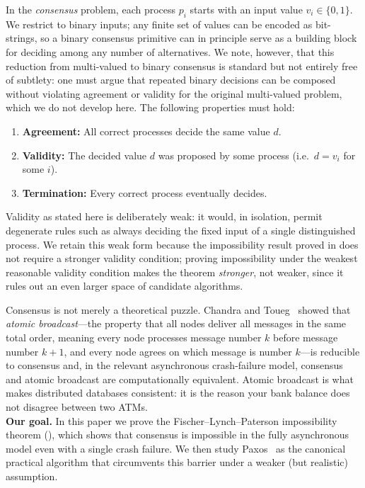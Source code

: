 \begin{smjdefinition}[Consensus]\label{def:consensus}
In the \emph{consensus} problem, each process $p_i$ starts with an input value $v_i \in \{0,1\}$. We restrict to binary inputs; any finite set of values can be encoded as bit-strings, so a binary consensus primitive can in principle serve as a building block for deciding among any number of alternatives. We note, however, that this reduction from multi-valued to binary consensus is standard but not entirely free of subtlety: one must argue that repeated binary decisions can be composed without violating agreement or validity for the original multi-valued problem, which we do not develop here. The following properties must hold:
\begin{enumerate}[label=(\roman*)]
    \item \textbf{Agreement:} All correct processes decide the same value $d$.
    \item \textbf{Validity:} The decided value $d$ was proposed by some process (i.e.\ $d = v_i$ for some $i$).
    \item \textbf{Termination:} Every correct process eventually decides.
\end{enumerate}
Validity as stated here is deliberately weak: it would, in isolation, permit degenerate rules such as always deciding the fixed input of a single distinguished process. We retain this weak form because the impossibility result proved in  does not require a stronger validity condition; proving impossibility under the weakest reasonable validity condition makes the theorem \emph{stronger}, not weaker, since it rules out an even larger space of candidate algorithms.
\end{smjdefinition}

Consensus is not merely a theoretical puzzle. Chandra and Toueg~\cite{chandra1996} showed that \emph{atomic broadcast}---the property that all nodes deliver all messages in the same total order, meaning every node processes message number $k$ before message number $k+1$, and every node agrees on which message is number $k$---is reducible to consensus and, in the relevant asynchronous crash-failure model, consensus and atomic broadcast are computationally equivalent. Atomic broadcast is what makes distributed databases consistent: it is the reason your bank balance does not disagree between two ATMs.
\\[6pt]
\textbf{Our goal.} In this paper we prove the Fischer--Lynch--Paterson impossibility theorem (), which shows that consensus is impossible in the fully asynchronous model even with a single crash failure. We then study Paxos~\cite{lamport1998} as the canonical practical algorithm that circumvents this barrier under a weaker (but realistic) assumption.


